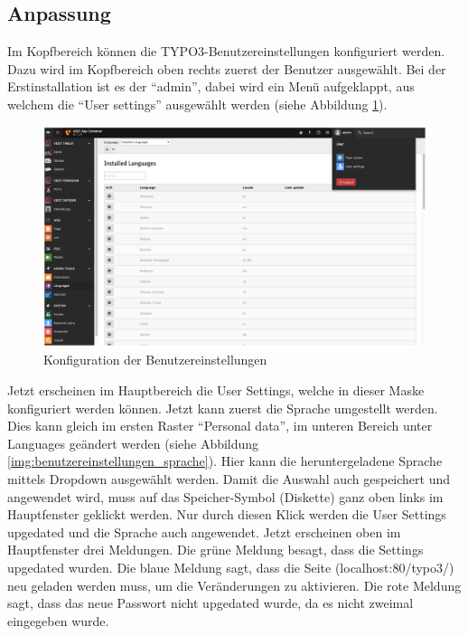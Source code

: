\subsection{Anpassung}

Im Kopfbereich können die TYPO3-Benutzereinstellungen konfiguriert werden. Dazu wird im Kopfbereich oben rechts zuerst der Benutzer ausgewählt. Bei der Erstinstallation ist es der “admin”, dabei wird ein Menü aufgeklappt, aus welchem die “User settings” ausgewählt werden (siehe Abbildung \ref{img:benutzereinstellungen}).

\begin{figure}[ht!]
\centering
\includegraphics[width=12cm]{Figures/paula/benutzereinstellungen.png}
\caption{Konfiguration der Benutzereinstellungen}
\label{img:benutzereinstellungen}
\end{figure}

Jetzt erscheinen im Hauptbereich die User Settings, welche in dieser Maske konfiguriert werden können. Jetzt kann zuerst die Sprache umgestellt werden. Dies kann gleich im ersten Raster “Personal data”, im unteren Bereich unter Languages geändert werden (siehe Abbildung \ref{img:benutzereinstellungen_sprache}). Hier kann die heruntergeladene Sprache mittels Dropdown ausgewählt werden. Damit die Auswahl auch gespeichert und angewendet wird, muss auf das Speicher-Symbol (Diskette) ganz oben links im Hauptfenster geklickt werden. Nur durch diesen Klick werden die User Settings upgedated und die Sprache auch angewendet. Jetzt erscheinen oben im Hauptfenster drei Meldungen. Die grüne Meldung besagt, dass die Settings upgedated wurden. Die blaue Meldung sagt, dass die Seite (localhost:80/typo3/) neu geladen werden muss, um die Veränderungen zu aktivieren. Die rote Meldung sagt, dass das neue Passwort nicht upgedated wurde, da es nicht zweimal eingegeben wurde.

